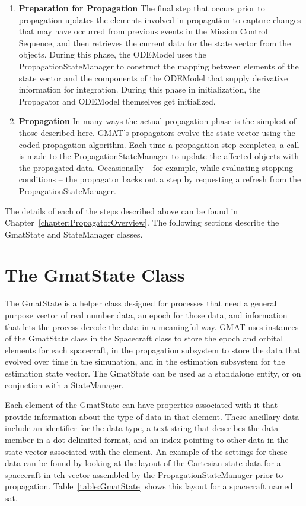 \begin{enumerate}
\item \textbf{Preparation for Propagation}  The final step that occurs prior to propagation updates
the elements involved in propagation to capture changes that may have occurred from previous
events in the Mission Control Sequence, and then retrieves the current data for the state vector
from the objects.  During this phase, the ODEModel uses the PropagationStateManager to construct the
mapping between elements of the state vector and the components of the ODEModel that supply
derivative information for integration.  During this phase in initialization, the Propagator and
ODEModel themselves get initialized.

\item \textbf{Propagation}  In many ways the actual propagation phase is the simplest of those
described here.  GMAT's propagators evolve the state vector using the coded propagation algorithm.
Each time a propagation step completes, a call is made to the PropagationStateManager to update the
affected objects with the propagated data.  Occasionally -- for example, while evaluating stopping
conditions -- the propagator backs out a step by requesting a refresh from the
PropagationStateManager.
\end{enumerate}

The details of each of the steps described above can be found in
Chapter~\ref{chapter:PropagatorOverview}.  The following sections describe the GmatState and
StateManager classes.


\section{The GmatState Class}

The GmatState is a helper class designed for processes that need a general purpose vector of real
number data, an epoch for those data, and information that lets the process decode the data in a
meaningful way.  GMAT uses instances of the GmatState class in the Spacecraft class to store the
epoch and orbital elements for each spacecraft, in the propagation subsystem to store the data that
evolved over time in the simunation, and in the estimation subsystem for the estimation state
vector.  The GmatState can be used as a standalone entity, or on conjuction with a StateManager.

Each element of the GmatState can have properties associated with it that provide information about
the type of data in that element.  These ancillary data include an identifier for the data type,
a text string that describes the data member in a dot-delimited format, and an index pointing to
other data in the state vector associated with the element.  An example of the settings for these
data can be found by looking at the layout of the Cartesian state data for a spacecraft in teh
vector assembled by the PropagationStateManager prior to propagation.  Table~\ref{table:GmatState}
shows this layout for a spacecraft named sat.

